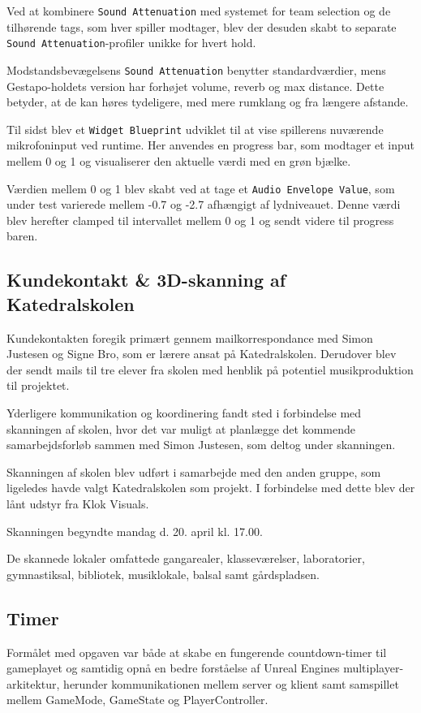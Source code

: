Ved at kombinere \texttt{Sound Attenuation} med systemet for team selection og de tilhørende tags, som hver spiller modtager, blev der desuden skabt to separate \texttt{Sound Attenuation}-profiler unikke for hvert hold.

Modstandsbevægelsens \texttt{Sound Attenuation} benytter standardværdier, mens Gestapo-holdets version har forhøjet volume, reverb og max distance. Dette betyder, at de kan høres tydeligere, med mere rumklang og fra længere afstande.

Til sidst blev et \texttt{Widget Blueprint} udviklet til at vise spillerens nuværende mikrofoninput ved runtime. Her anvendes en progress bar, som modtager et input mellem 0 og 1 og visualiserer den aktuelle værdi med en grøn bjælke.

Værdien mellem 0 og 1 blev skabt ved at tage et \texttt{Audio Envelope Value}, som under test varierede mellem -0.7 og -2.7 afhængigt af lydniveauet. Denne værdi blev herefter clamped til intervallet mellem 0 og 1 og sendt videre til progress baren.


\newpage

\subsection{Kundekontakt \& 3D-skanning af Katedralskolen}

Kundekontakten foregik primært gennem mailkorrespondance med Simon Justesen og Signe Bro, som er lærere ansat på Katedralskolen. Derudover blev der sendt mails til tre elever fra skolen med henblik på potentiel musikproduktion til projektet.

Yderligere kommunikation og koordinering fandt sted i forbindelse med skanningen af skolen, hvor det var muligt at planlægge det kommende samarbejdsforløb sammen med Simon Justesen, som deltog under skanningen.

Skanningen af skolen blev udført i samarbejde med den anden gruppe, som ligeledes havde valgt Katedralskolen som projekt. I forbindelse med dette blev der lånt udstyr fra Klok Visuals.

Skanningen begyndte mandag d. 20. april kl. 17.00.

De skannede lokaler omfattede gangarealer, klasseværelser, laboratorier, gymnastiksal, bibliotek, musiklokale, balsal samt gårdspladsen.


\newpage
\subsection{Timer}
Formålet med opgaven var både at skabe en fungerende countdown-timer til gameplayet og samtidig opnå en bedre forståelse af Unreal Engines multiplayer-arkitektur, herunder kommunikationen mellem server og klient samt samspillet mellem GameMode, GameState og PlayerController.

